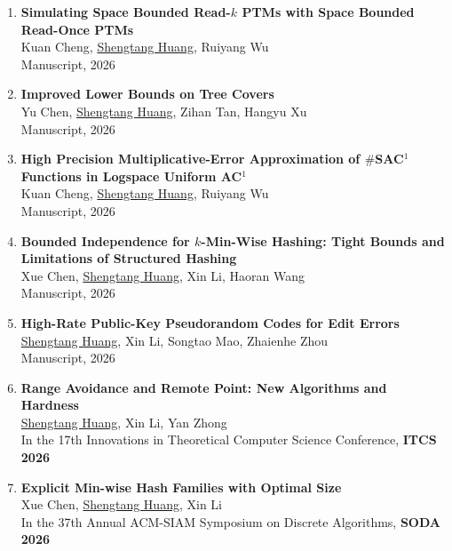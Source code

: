 \documentclass[a4paper,12pt]{ctexart}
\begin{document}
\begin{enumerate}
    \item \textbf{Simulating Space Bounded Read-$k$ PTMs with Space Bounded Read-Once PTMs} \\
           Kuan Cheng, \underline{Shengtang Huang}, Ruiyang Wu \\
           Manuscript, 2026

    \item \textbf{Improved Lower Bounds on Tree Covers} \\
           Yu Chen, \underline{Shengtang Huang}, Zihan Tan, Hangyu Xu \\
           Manuscript, 2026

    \item \textbf{High Precision Multiplicative-Error Approximation of $\#$SAC$^1$ Functions in Logspace Uniform AC$^1$} \\
           Kuan Cheng, \underline{Shengtang Huang}, Ruiyang Wu \\
           Manuscript, 2026
    
    \item \textbf{Bounded Independence for $k$-Min-Wise Hashing: Tight Bounds and Limitations of Structured Hashing} \\
           Xue Chen, \underline{Shengtang Huang}, Xin Li, Haoran Wang \\
           Manuscript, 2026

    \item \textbf{High-Rate Public-Key Pseudorandom Codes for Edit Errors} \\
           \underline{Shengtang Huang}, Xin Li, Songtao Mao, Zhaienhe Zhou \\
           Manuscript, 2026

    \item \textbf{Range Avoidance and Remote Point: New Algorithms and Hardness} \\
           \underline{Shengtang Huang}, Xin Li, Yan Zhong \\
           In the 17th Innovations in Theoretical Computer Science Conference, \textbf{ITCS 2026}

    \item \textbf{Explicit Min-wise Hash Families with Optimal Size} \\
           Xue Chen, \underline{Shengtang Huang}, Xin Li \\
           In the 37th Annual ACM-SIAM Symposium on Discrete Algorithms, \textbf{SODA 2026}
\end{enumerate}
\end{document}
